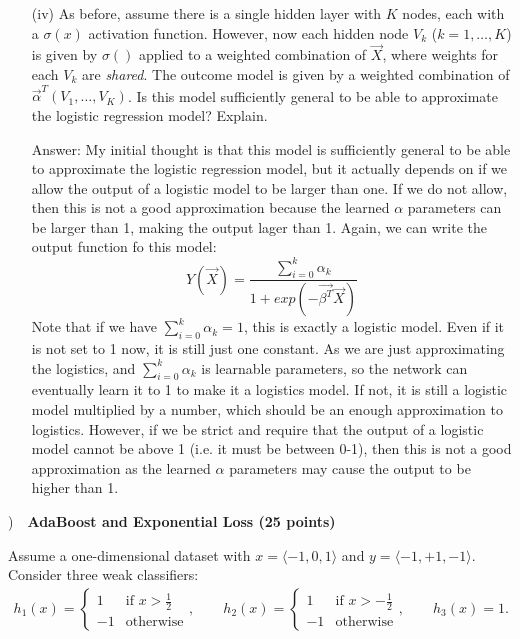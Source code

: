 \documentclass[11pt]{article}
\newcounter{questionnumber}
\newcommand{\questionnumber}{\noindent \arabic{questionnumber}\stepcounter{questionnumber})~~}
\begin{document}
\begin{itemize}
\item[(iv)] As before, assume there is a single hidden layer with $K$ nodes, each with a $\sigma(x)$ activation function.  However, now each hidden node $V_k$ ($k = 1, \ldots, K$) is given by
$\sigma()$ applied to a weighted combination of $\vec{X}$, where weights for each $V_k$ are \emph{shared}.  The outcome model is given by a weighted combination of $\vec{\alpha}^T (V_1, \ldots, V_K)$.  Is this model sufficiently general to be able to approximate the logistic regression model?  Explain.

Answer: My initial thought is that this model is sufficiently general to be able to approximate the logistic regression model, but it actually depends on if we allow the output of a logistic model to be larger than one. If we do not allow, then this is not a good approximation because the learned $\alpha$ parameters can be larger than 1, making the output lager than 1.
Again, we can write the output function fo this model:
$$Y(\vec X)=\frac{\sum_{i=0}^{k}\alpha_k}{1+exp(-\vec{\beta^T}\vec X)}$$
Note that if we have $\sum_{i=0}^{k}\alpha_k = 1$, this is exactly a logistic model. Even if it is not set to 1 now, it is still just one constant. As we are just approximating the logistics, and $\sum_{i=0}^{k}\alpha_k$ is learnable parameters, so the network can eventually learn it to 1 to make it a logistics model. If not, it is still a logistic model multiplied by a number, which should be an enough approximation to logistics. However, if we be strict and require that the output of a logistic model cannot be above 1 (i.e. it must be between 0-1), then this is not a good approximation as the learned $\alpha$ parameters may cause the output to be higher than 1.


\end{itemize}

\newpage

\questionnumber {\bf AdaBoost and Exponential Loss (25 points)}

%
%

Assume a one-dimensional dataset with $x = \langle -1, 0, 1 \rangle$ and $y =
\langle -1, +1, -1 \rangle$.  Consider three weak classifiers:
\begin{align*}
  h_1(x) = \begin{cases}
    1  & \text{if } x > \frac{1}{2} \\
    -1 & \text{otherwise}
  \end{cases},
  \quad\quad
  h_2(x) = \begin{cases}
    1  & \text{if } x > - \frac{1}{2} \\
    -1 & \text{otherwise}
  \end{cases},
  \quad\quad
  h_3(x) = 1.
\end{align*}
\end{document}
